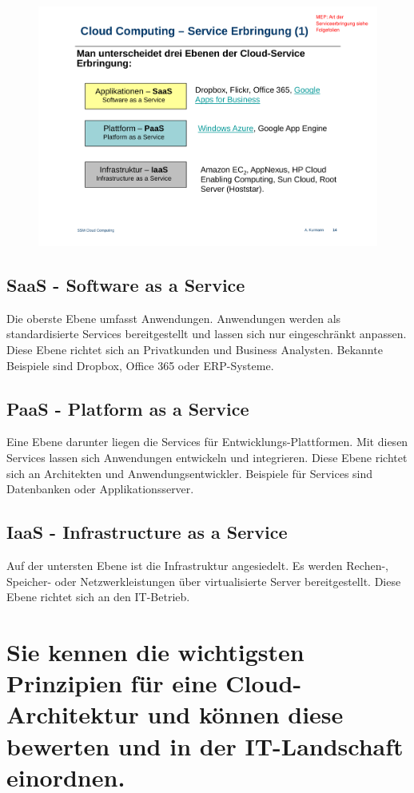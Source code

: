 \begin{figure}
\centering
\includegraphics[width=0.5\linewidth]{fig/cloud-erbringung}
\caption{}
\label{fig:cloud-erbringung}
\end{figure}

\subsection{SaaS - Software as a Service}

Die oberste Ebene umfasst Anwendungen. Anwendungen werden als standardisierte Services bereitgestellt und lassen sich nur eingeschränkt anpassen. Diese Ebene richtet sich an Privatkunden und Business Analysten. Bekannte Beispiele sind Dropbox, Office 365 oder ERP-Systeme.

\subsection{PaaS - Platform as a Service}

Eine Ebene darunter liegen die Services für Entwicklungs-Plattformen. Mit diesen Services lassen sich Anwendungen entwickeln und integrieren. Diese Ebene richtet sich an Architekten und Anwendungsentwickler. Beispiele für Services sind Datenbanken oder Applikationsserver.

\subsection{IaaS - Infrastructure as a Service}

Auf der untersten Ebene ist die Infrastruktur angesiedelt. Es werden Rechen-, Speicher- oder Netzwerkleistungen über virtualisierte Server bereitgestellt. Diese Ebene richtet sich an den IT-Betrieb.

\section{Sie kennen die wichtigsten Prinzipien für eine Cloud-Architektur und können diese bewerten und in der IT-Landschaft einordnen.}

